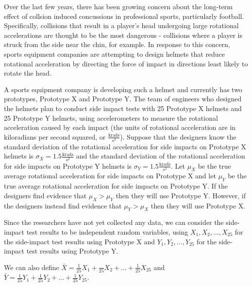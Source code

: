 \documentclass[11pt]{article}\usepackage[]{graphicx}\usepackage[]{color}
\begin{document}
\item 


   Over the last few years, there has been growing concern about the long-term effect of collsion induced concussions in professional sports, particularly football.
   Specifically, collisions that result in a player's head undergoing large rotational accelerations are thought to be the most dangerous - collisions where a player is struck from the side near the chin, for example.
   In response to this concern, sports equipment companies are attempting to design helmets that reduce rotational acceleration by directing the force of impact in directions least likely to rotate the head.

   A sports equipment company is developing such a helmet and currently has two prototypes, Prototype X and Prototype Y. 
   The team of engineers who designed the helmets plan to conduct side impact tests with 25 Prototype X helmets and 25 Prototype Y helmets, using accelerometers to measure the rotational acceleration caused by each impact (the units of rotational acceleration are in kiloradians per second squared, or $\frac{\text{krads}}{s^2}$).
   Suppose that the designers know the standard deviation of the rotational acceleration for side impacts on Prototype X helmets is $\sigma_X = 1.5 \frac{\text{krads}}{s^2}$ and the standard deviation of the rotational acceleration for side impacts on Prototype Y helmets is $\sigma_Y = 1.5 \frac{\text{krads}}{s^2}$.
   Let $\mu_X$ be the true average rotational acceleration for side impacts on Prototype X and let $\mu_Y$ be the true average rotational acceleration for side impacts on Prototype Y.
   If the designers find evidence that $\mu_X > \mu_Y$ then they will use Prototype Y. 
   However, if the designers instead find evidence that $\mu_Y > \mu_X$ then they will use Prototype X. 

   Since the researchers have not yet collected any data, we can consider the side-impact test results to be independent random variables, using 
   $X_1, X_2, \ldots, X_{25}$ for the side-impact test results using Prototype X and $Y_1, Y_2, \ldots, Y_{25}$ for the side-impact test results using Prototype Y.

   We can also define $\bar{X} = \frac{1}{25} X_1 + \frac{}{25} X_2 + \ldots + \frac{1}{25} X_{25}$ and $\bar{Y} = \frac{1}{25} Y_1 + \frac{1}{25} Y_2 + \ldots + \frac{1}{25} Y_{25}$.
\end{document}
